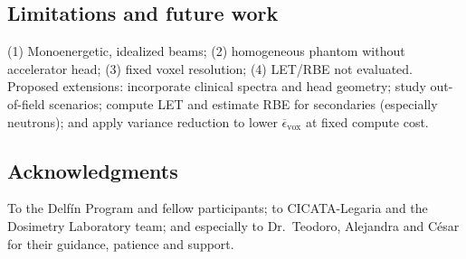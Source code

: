 \documentclass[11pt,a4paper]{article}
\begin{document}
\subsection*{Limitations and future work}
(1) Monoenergetic, idealized beams; (2) homogeneous phantom without accelerator head;
(3) fixed voxel resolution; (4) LET/RBE not evaluated. Proposed extensions:
incorporate clinical spectra and head geometry; study out-of-field scenarios; compute
LET and estimate RBE for secondaries (especially neutrons); and apply
variance reduction to lower \(\overline{\epsilon}_{\text{vox}}\) at fixed compute cost.

\subsection*{Acknowledgments}
To the Delf\'in Program and fellow participants; to CICATA-Legaria and the Dosimetry
Laboratory team; and especially to Dr.\ Teodoro, Alejandra and C\'esar for their
guidance, patience and support.



\end{document}
